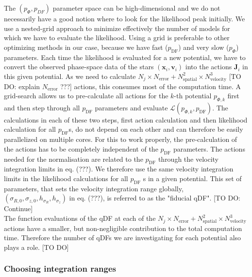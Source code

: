 \documentclass[12pt,preprint]{aastex}
\newcommand{\vect}[1]{\boldsymbol{#1}} %
\begin{document}
The $(p_\Phi,p_{DF})$ parameter space can be high-dimensional and we do not necessarily have a good notion where to look for the likelihood peak initially. We use a nested-grid approach to minimize effectively the number of models for which we have to evaluate the likelihood. Using a grid is preferable to other optimizing methods in our case, because we have fast ($p_\text{DF}$) and very slow ($p_\Phi$) parameters. Each time the likelihood is evaluated for a new potential, we have to convert the observed phase-space data of the stars $(\vect{x}_i,\vect{v}_i)$ into the actions $\vect{J}_i$ in this given potential. As we need to calculate  $N_j \times N_\text{error} +  N_\text{spatial}^2 \times N_\text{velocity}^3$ [TO DO: explain $N_\text{error}$ ???] actions, this consumes most of the computation time. A grid-search allows us to pre-calculate all actions for the $k$-th potential $p_{\Phi,k}$ first and then step through all $p_\text{DF}$ parameters and evaluate $\mathscr{L} (p_{\Phi,k},p_\text{DF})$. The calculations in each of these two steps, first action calculation and then likelihood calculation for all $p_\text{DF}$s, do not depend on each other and can therefore be easily parallelized on multiple cores. For this to work properly, the pre-calculation of the actions has to be completely independent of the $p_\text{DF}$ parameters. The actions needed for the normalisation are related to the $p_\text{DF}$ through the velocity integration limits in eq. (???). We therefore use the same velocity integration limits in the likelihood calculations for all $p_\text{DF}$ s in a given potential. This set of parameters, that sets the velocity integration range globally, $(\sigma_{R,0},\sigma_{z,0},h_{\sigma_R},h_{\sigma_z})$ in eq. (???), is referred to as the "fiducial qDF". [TO DO: Continue]
\\The function evaluations of the qDF at each of the $N_j \times N_\text{error} +  N_\text{spatial}^2 \times N_\text{velocity}^3$ actions have a smaller, but non-negligible contribution to the total computation time. Therefore the number of qDFs we are investigating for each potential also plays a role.
[TO DO]



\subsubsection{Choosing integration ranges}
\end{document}
